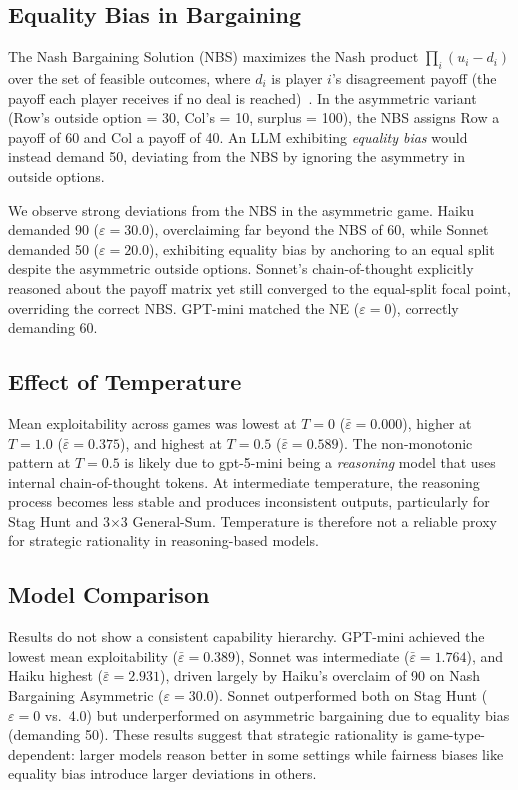 \documentclass[10pt,twocolumn]{article}
\begin{document}
\subsection{Equality Bias in Bargaining}

The Nash Bargaining Solution (NBS) maximizes the Nash product
$\prod_i (u_i - d_i)$ over the set of feasible outcomes, where $d_i$ is
player $i$'s disagreement payoff (the payoff each player receives if no deal
is reached)~\cite{nash1950bargaining}.
In the asymmetric variant (Row's outside option = 30, Col's = 10, surplus = 100),
the NBS assigns Row a payoff of 60 and Col a payoff of 40.
An LLM exhibiting \emph{equality bias} would instead demand 50,
deviating from the NBS by ignoring the asymmetry in outside options.

We observe strong deviations from the NBS in the asymmetric game.
Haiku demanded 90 ($\varepsilon = 30.0$), overclaiming far beyond the NBS of 60,
while Sonnet demanded 50 ($\varepsilon = 20.0$), exhibiting equality bias by
anchoring to an equal split despite the asymmetric outside options.
Sonnet's chain-of-thought explicitly reasoned about the payoff matrix yet still
converged to the equal-split focal point, overriding the correct NBS.
GPT-mini matched the NE ($\varepsilon = 0$), correctly demanding 60.

\subsection{Effect of Temperature}

Mean exploitability across games was lowest at $T{=}0$ ($\bar\varepsilon =
0.000$), higher at $T{=}1.0$ ($\bar\varepsilon = 0.375$), and highest at
$T{=}0.5$ ($\bar\varepsilon = 0.589$).
The non-monotonic pattern at $T{=}0.5$ is likely due to gpt-5-mini being a
\emph{reasoning} model that uses internal chain-of-thought tokens.
At intermediate temperature, the reasoning process becomes less stable and
produces inconsistent outputs, particularly for Stag Hunt and 3$\times$3
General-Sum.
Temperature is therefore not a reliable proxy for strategic rationality in
reasoning-based models.

\subsection{Model Comparison}

Results do not show a consistent capability hierarchy.
GPT-mini achieved the lowest mean exploitability ($\bar\varepsilon = 0.389$),
Sonnet was intermediate ($\bar\varepsilon = 1.764$), and Haiku highest
($\bar\varepsilon = 2.931$), driven largely by Haiku's overclaim of 90 on Nash
Bargaining Asymmetric ($\varepsilon = 30.0$).
Sonnet outperformed both on Stag Hunt ($\varepsilon = 0$ vs.\ 4.0) but
underperformed on asymmetric bargaining due to equality bias (demanding 50).
These results suggest that strategic rationality is game-type-dependent: larger
models reason better in some settings while fairness biases like equality bias
introduce larger deviations in others.
\end{document}
